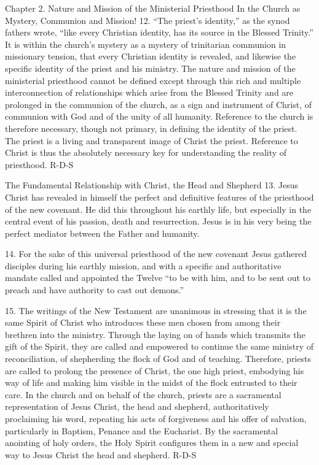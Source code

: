 \documentclass[oneside]{book}
\begin{document}
Chapter 2. Nature and Mission of the Ministerial Priesthood
In the Church as Mystery, Communion and Mission!
12. ``The priest's identity,'' as the synod fathers wrote, ``like every
Christian identity, has its source in the Blessed Trinity.'' It is within the
church's mystery as a mystery of trinitarian communion in missionary tension,
that every Christian identity is revealed, and likewise the specific identity of
the priest and his ministry. The nature and mission of the ministerial
priesthood cannot be defined except through this rich and multiple
interconnection of relationships which arise from the Blessed Trinity and are
prolonged in the communion of the church, as a sign and instrument of Christ, of
communion with God and of the unity of all humanity. Reference to the church is
therefore necessary, though not primary, in defining the identity of the
priest. The priest is a living and transparent image of Christ the
priest. Reference to Christ is thus the absolutely necessary key for
understanding the reality of priesthood.
R-D-S

The Fundamental Relationship with Christ, the Head and Shepherd
13. Jesus Christ has revealed in himself the perfect and definitive features of
the priesthood of the new covenant. He did this throughout his earthly life, but
especially in the central event of his passion, death and resurrection. Jesus is
in his very being the perfect mediator between the Father and humanity.

14. For the sake of this universal priesthood of the new covenant Jesus gathered
disciples during his earthly mission, and with a specific and authoritative
mandate called and appointed the Twelve ``to be with him, and to be sent out to
preach and have authority to cast out demons.''

15. The writings of the New Testament are unanimous in stressing that it is the
same Spirit of Christ who introduces these men chosen from among their brethren
into the ministry. Through the laying on of hands which transmits the gift of
the Spirit, they are called and empowered to continue the same ministry of
reconciliation, of shepherding the flock of God and of teaching. Therefore,
priests are called to prolong the presence of Christ, the one high priest,
embodying his way of life and making him visible in the midst of the flock
entrusted to their care.
In the church and on behalf of the church, priests are a sacramental
representation of Jesus Christ, the head and shepherd, authoritatively
proclaiming his word, repeating his acts of forgiveness and his offer of
salvation, particularly in Baptism, Penance and the Eucharist. By the
sacramental anointing of holy orders, the Holy Spirit configures them in a new
and special way to Jesus Christ the head and shepherd.
R-D-S
\end{document}
